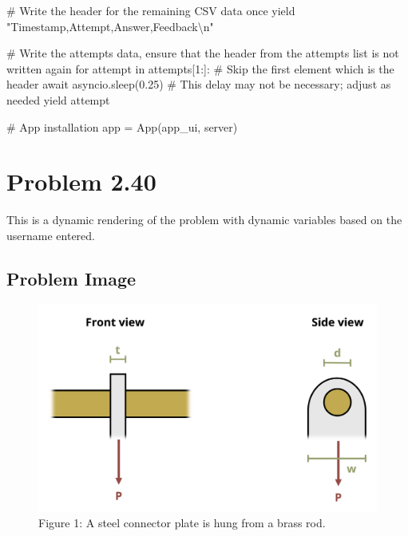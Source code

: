 \documentclass[
  letterpaper,
  DIV=11,
  numbers=noendperiod]{scrreprt}
\newenvironment{Shaded}{\begin{snugshade}}{\end{snugshade}}
\newcommand{\NormalTok}[1]{\textcolor[rgb]{0.00,0.23,0.31}{#1}}
\begin{document}
\begin{Shaded}
\begin{Highlighting}[]
\NormalTok{        \# Write the header for the remaining CSV data once}
\NormalTok{        yield "Timestamp,Attempt,Answer,Feedback\textbackslash{}n"}
        
\NormalTok{        \# Write the attempts data, ensure that the header from the attempts list is not written again}
\NormalTok{        for attempt in attempts[1:]:  \# Skip the first element which is the header}
\NormalTok{            await asyncio.sleep(0.25)  \# This delay may not be necessary; adjust as needed}
\NormalTok{            yield attempt}


\NormalTok{\# App installation}
\NormalTok{app = App(app\_ui, server)}
\end{Highlighting}
\end{Shaded}

\chapter*{Problem 2.40}\label{problem-2.40}


This is a dynamic rendering of the problem with dynamic variables based
on the username entered.

\section*{Problem Image}\label{problem-image-11}


\begin{figure}[H]

{\centering \includegraphics{images/169.png}

}

\caption{Figure 1: A steel connector plate is hung from a brass rod.}

\end{figure}%
\end{document}
